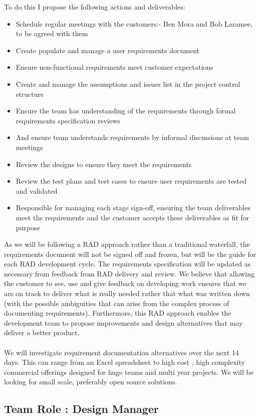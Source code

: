 \documentclass{article}
\begin{document}
To do this I propose the following actions and deliverables:
\begin{itemize}
\item Schedule regular meetings with the customers:- Ben Mora and Bob Laramee, to be agreed with them
\item Create populate and manage a user requirements document
\item Ensure non-functional requirements meet customer expectations
\item Create and manage the assumptions and issues list in the project control structure
\item Ensure the team has understanding of the requirements through formal requirements specification reviews
\item And ensure team understands requirements by informal discussions at team meetings
\item Review the designs to ensure they meet the requirements
\item Review the test plans and test cases to ensure user requirements are tested and validated
\item Responsible for managing each stage sign-off, ensuring the team deliverables meet the requirements and the customer accepts these deliverables as fit for purpose
\end{itemize}
As we will be following a RAD approach rather than a traditional waterfall, the requirements document will not be signed off and frozen, but will be the guide for each RAD development cycle. The requirements specification will be updated as necessary from feedback from RAD delivery and review. We believe that allowing the customer to see, use and give feedback on developing work ensures that we are on track to deliver what is really needed rather that what was written down (with the possible ambiguities that can arise from the complex process of documenting requirements). Furthermore, this RAD approach enables the development team to propose improvements and design alternatives that may deliver a better product.
\\
\\
We will investigate  requirement documentation alternatives over the next 14 days. This can range from an Excel spreadsheet to high cost , high complexity commercial offerings designed for huge teams and multi year projects. We will be looking for small scale, preferably open source solutions. 
\newpage
\subsection{Team Role : Design Manager}
\newpage
\end{document}
